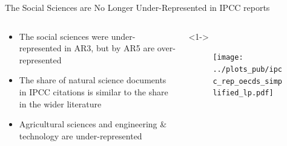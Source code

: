 \documentclass[9pt, aspectratio=169]{beamer}
\begin{document}
\begin{frame}{The Social Sciences are No Longer Under-Represented in IPCC reports}
\begin{columns}
	
	\begin{column}{0.382\linewidth}
		\begin{itemize}
			\item<1-> The social sciences were under-represented in AR3, but by AR5 are over-represented
			\item<2-> The share of natural science documents in IPCC citations is similar to the share in the wider literature
			\item<3-> Agricultural sciences and engineering \& technology are under-represented		
		\end{itemize}
	\end{column}
	
	\begin{column}{0.618\linewidth}<1->
		\begin{figure}[h!]
			\begin{center}
				\texttt{[image: ../plots\_pub/ipcc\_rep\_oecds\_simplified\_lp.pdf]}
			\end{center}
		\end{figure}
	\end{column}
\end{columns}
\end{frame}
\end{document}
